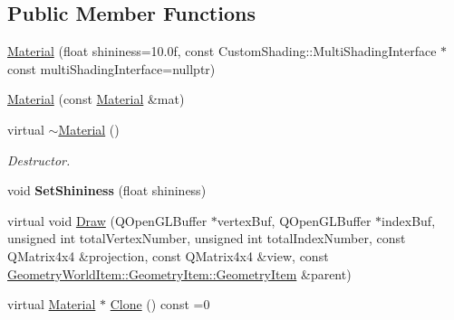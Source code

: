 \subsection*{Public Member Functions}
\begin{DoxyCompactItemize}
\item 
\mbox{\hyperlink{class_geometry_engine_1_1_geometry_material_1_1_material_acd2eb27d61c59aa8811a0536cc882dc5}{Material}} (float shininess=10.\+0f, const Custom\+Shading\+::\+Multi\+Shading\+Interface $\ast$const multi\+Shading\+Interface=nullptr)
\item 
\mbox{\hyperlink{class_geometry_engine_1_1_geometry_material_1_1_material_a18c3bbd40d6c410c9c8ca9dfc36f15ee}{Material}} (const \mbox{\hyperlink{class_geometry_engine_1_1_geometry_material_1_1_material}{Material}} \&mat)
\item 
\mbox{\label{class_geometry_engine_1_1_geometry_material_1_1_material_a55a707060a08e18b45c7ea3f0ec64704}} 
virtual \mbox{\hyperlink{class_geometry_engine_1_1_geometry_material_1_1_material_a55a707060a08e18b45c7ea3f0ec64704}{$\sim$\+Material}} ()
\begin{DoxyCompactList}\small\item\em Destructor. \end{DoxyCompactList}\item 
\mbox{\label{class_geometry_engine_1_1_geometry_material_1_1_material_a2b3269750da169f6228f78beac202bac}} 
void {\bfseries Set\+Shininess} (float shininess)
\item 
virtual void \mbox{\hyperlink{class_geometry_engine_1_1_geometry_material_1_1_material_ae337c74e4f500d0a881779c2c3495908}{Draw}} (Q\+Open\+G\+L\+Buffer $\ast$vertex\+Buf, Q\+Open\+G\+L\+Buffer $\ast$index\+Buf, unsigned int total\+Vertex\+Number, unsigned int total\+Index\+Number, const Q\+Matrix4x4 \&projection, const Q\+Matrix4x4 \&view, const \mbox{\hyperlink{class_geometry_engine_1_1_geometry_world_item_1_1_geometry_item_1_1_geometry_item}{Geometry\+World\+Item\+::\+Geometry\+Item\+::\+Geometry\+Item}} \&parent)
\item 
virtual \mbox{\hyperlink{class_geometry_engine_1_1_geometry_material_1_1_material}{Material}} $\ast$ \mbox{\hyperlink{class_geometry_engine_1_1_geometry_material_1_1_material_ae5513ff06d536365e18ddc5e07e79784}{Clone}} () const =0
\item 

\end{DoxyCompactItemize}
